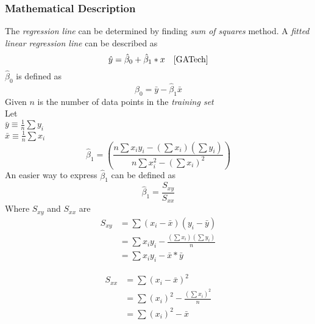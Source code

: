 \documentclass[a4paper]{article}
\begin{document}
\subsubsection{Mathematical Description}
The \textit{regression line} can be determined by finding \textit{sum of squares} method. A
\textit{fitted linear regression line} can be described as
\begin{equation}
\hat y=\hat \beta_{0}+\hat \beta_1*x \, \, \, \, \, \,\cite{GATech}
\end{equation}
$\hat \beta_0$ is defined as 
\begin{equation}
	\hat \beta_0 = \bar y - \hat \beta_1 \bar x
\end{equation}
Given $n$ is the number of data points in the \textit{training set}\\
Let \\$\bar y \equiv \frac{1}{n} \sum y_i$ \\
 $\bar x \equiv \frac{1}{n}\sum x_i$
\begin{equation}
	\hat \beta_1 = \left(\frac{n \sum x_iy_i - (\sum x_i)(\sum y_i)}{n\sum x_i^2 - (\sum x_i)^2}\right)
\end{equation}
An easier way to express $\hat \beta_1$ can be defined as
\begin{equation}
	\hat \beta_1 = \frac{S_{xy}}{S_{xx}}
\end{equation}
Where $S_{xy}$ and $S_{xx}$ are 
\begin{align*}
S_{xy}&= \sum(x_i-\bar x)(y_i-\bar y) \\
	  &= \sum x_iy_i-\frac{(\sum x_i)(\sum y_i)}{n}\\
	  &= \sum x_iy_i-\bar x *\bar y
\end{align*}

\begin{align*}
S_{xx} &= \sum(x_i - \bar x)^2 \\
&= \sum (x_i)^2 - \frac{(\sum x_i)^2}{n}\\
&= \sum (x_i)^2 - \bar x
\end{align*}
\end{document}
